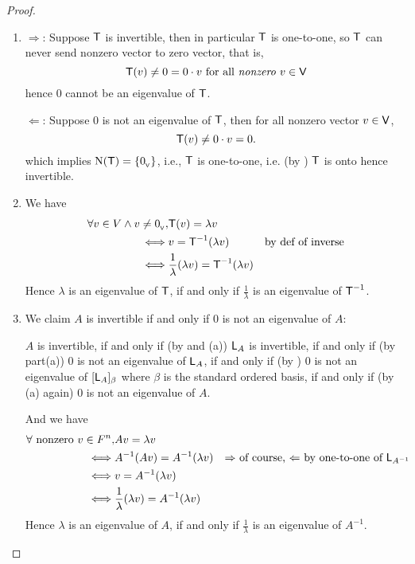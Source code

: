 \begin{proof} \ 

\begin{enumerate}
\item \(\Longrightarrow\): Suppose \(\textsf{T}\) is invertible,
then in particular \(\textsf{T}\) is one-to-one, so \(\textsf{T}\) can never send nonzero vector to zero vector,
that is,
\[
    \textsf{T}(v) \ne 0 = 0 \cdot v \text{ for all \emph{nonzero} \(v \in \textsf{V}\)}
\]
hence \(0\) cannot be an eigenvalue of \(\textsf{T}\).

\(\Longleftarrow\): Suppose \(0\) is not an eigenvalue of \(\textsf{T}\), then for all nonzero vector \(v \in \textsf{V}\),
\[
    \textsf{T}(v) \ne 0 \cdot v = 0.
\]
which implies \(\mathrm{N}(\textsf{T}) = \{ 0_{_{\textsf{V}}} \}\), i.e., \(\textsf{T}\) is one-to-one, i.e. (by ) \(\textsf{T}\) is onto hence invertible.

\item We have
\begin{align*}
    \forall v \in V \land v \ne 0_{_{\textsf{V}}}, 
         & \textsf{T}(v) = \lambda v \\
    \iff & v = \textsf{T}^{-1}(\lambda v) & \text{by def of inverse} \\
    \iff & \frac{1}{\lambda} (\lambda v) = \textsf{T}^{-1}(\lambda v)
\end{align*}
Hence \(\lambda\) is an eigenvalue of \(\textsf{T}\), if and only if \(\frac{1}{\lambda}\) is an eigenvalue of \(\textsf{T}^{-1}\).

\item We claim \(A\) is invertible if and only if \(0\) is not an eigenvalue of \(A\):

\(A\) is invertible, if and only if (by  and (a)) \(\textsf{L}_A\) is invertible, if and only if (by part(a)) \(0\) is not an eigenvalue of \(\textsf{L}_A\), if and only if (by ) \(0\) is not an eigenvalue of \([\textsf{L}_A]_{\beta}\) where \(\beta\) is the standard ordered basis, if and only if (by (a) again) \(0\) is not an eigenvalue of \(A\).

And we have
\begin{align*}
    \forall \text{ nonzero } v \in F^n, 
         & Av = \lambda v \\
    \iff & A^{-1}(Av) = A^{-1}(\lambda v) & \text{\(\Rightarrow\) of course, \(\Leftarrow\) by one-to-one of \(\textsf{L}_{A^{-1}}\)} \\
    \iff & v = A^{-1}(\lambda v) \\
    \iff & \frac{1}{\lambda} (\lambda v) = A^{-1}(\lambda v)
\end{align*}
Hence \(\lambda\) is an eigenvalue of \(A\), if and only if \(\frac{1}{\lambda}\) is an eigenvalue of \(A^{-1}\).
\end{enumerate}
\end{proof}

